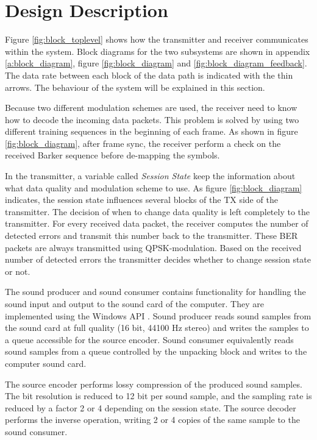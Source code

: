 \section{Design Description}
\label{sec:design_description}
Figure \ref{fig:block_toplevel} shows how the transmitter and receiver communicates within the system. Block diagrams for the two subsystems are shown in appendix \ref{a:block_diagram}, figure \ref{fig:block_diagram} and \ref{fig:block_diagram_feedback}. The data rate between each block of the data path is indicated with the thin arrows. The behaviour of the system will be explained in this section. 

Because two different modulation schemes are used, the receiver need to know how to decode the incoming data packets. This problem is solved by using two different training sequences in the beginning of each frame. As shown in figure \ref{fig:block_diagram}, after frame sync, the receiver perform a check on the received Barker sequence before de-mapping the symbols. 

In the transmitter, a variable called \textit{Session State} keep the information about what data quality and modulation scheme to use. As figure \ref{fig:block_diagram} indicates, the session state influences several blocks of the TX side of the transmitter. The decision of when to change data quality is left completely to the transmitter. For every received data packet, the receiver computes the number of detected errors and transmit this number back to the transmitter. These BER packets are always transmitted using QPSK-modulation. Based on the received number of detected errors the transmitter decides whether to change session state or not. 

The sound producer and sound consumer contains functionality for handling the sound input and output to the sound card of the computer. They are implemented using the Windows API \cite{WinAPI}. Sound producer reads sound samples from the sound card at full quality (16 bit, 44100 Hz stereo) and writes the samples to a queue accessible for the source encoder. Sound consumer equivalently reads sound samples from a queue controlled by the unpacking block and writes to the computer sound card. 

The source encoder performs lossy compression of the produced sound samples. The bit resolution is reduced to 12 bit per sound sample, and the sampling rate is reduced by a factor 2 or 4 depending on the session state. The source decoder performs the inverse operation, writing 2 or 4 copies of the same sample to the sound consumer.  

